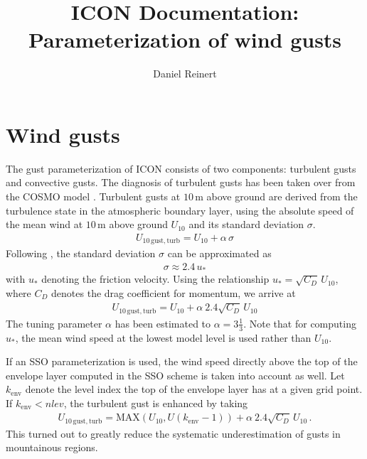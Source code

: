\documentclass[a4paper,11pt]{article}
\author{Daniel Reinert}
\title{ICON Documentation: Parameterization of wind gusts}
\begin{document}
  \maketitle



\section{Wind gusts}

The gust parameterization of ICON consists of two components: turbulent gusts and convective gusts. The diagnosis of turbulent gusts has been taken over from the COSMO 
model \citep{Schulz:2003,Schulz:2008}. Turbulent gusts at $10\,\mathrm{m}$ above ground are derived from the turbulence state in the atmospheric boundary layer, using the absolute speed 
of the mean wind at $10\,\mathrm{m}$ above ground $U_{10}$ and its standard deviation $\sigma$.
\begin{align}
 U_{10\,\mathrm{gust, turb}} = U_{10} + \alpha\, \sigma
\end{align}
Following \cite{Panofsky:1984}, the standard deviation $\sigma$ can be approximated as
\begin{align*}
 \sigma \approx 2.4\,u_{\ast}
\end{align*}
with $u_{\ast}$ denoting the friction velocity. Using the relationship $u_{\ast}=\sqrt{C_{D}}\,U_{10}$, where $C_{D}$ denotes the drag coefficient for momentum, we 
arrive at
\begin{align}
 U_{10\,\mathrm{gust, turb}} = U_{10} + \alpha\ 2.4 \sqrt{C_{D}}\,U_{10} \label{eq_turb_gust}
\end{align}
The tuning parameter $\alpha$ has been estimated to $\alpha=3\frac{1}{3}$. Note that for computing $u_{\ast}$, the mean wind speed at the lowest model level is used rather 
than $U_{10}$.

If an SSO parameterization is used, the wind speed directly above the top of the envelope layer computed in the SSO
scheme is taken into account as well. Let $k_\mathrm{env}$ denote the level index the top of the envelope layer has at a given
grid point. If $k_\mathrm{env} < nlev$, the turbulent gust is enhanced by taking
\begin{align}
 U_{10\,\mathrm{gust, turb}} = \mathrm{MAX}( U_{10}, U(k_\mathrm{env} -1)) + \alpha\ 2.4 \sqrt{C_{D}}\,U_{10} \,.
\end{align}
This turned out to greatly reduce the systematic underestimation of gusts in mountainous regions.
\end{document}

